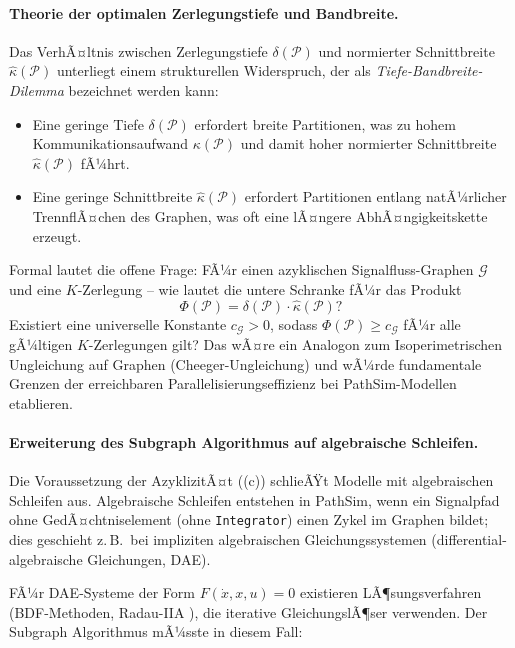 ﻿\documentclass[12pt,a4paper]{article}
\theoremstyle{definition}
\begin{document}
\paragraph{Theorie der optimalen Zerlegungstiefe und Bandbreite.}
Das VerhÃ¤ltnis zwischen Zerlegungstiefe $\delta(\mathcal{P})$ und
normierter Schnittbreite $\hat{\kappa}(\mathcal{P})$ unterliegt einem
strukturellen Widerspruch, der als \emph{Tiefe-Bandbreite-Dilemma}
bezeichnet werden kann:

\begin{itemize}[nosep]
  \item Eine geringe Tiefe $\delta(\mathcal{P})$ erfordert breite Partitionen,
        was zu hohem Kommunikationsaufwand $\kappa(\mathcal{P})$
        und damit hoher normierter Schnittbreite $\hat{\kappa}(\mathcal{P})$ fÃ¼hrt.
  \item Eine geringe Schnittbreite $\hat{\kappa}(\mathcal{P})$ erfordert
        Partitionen entlang natÃ¼rlicher TrennflÃ¤chen des Graphen,
        was oft eine lÃ¤ngere AbhÃ¤ngigkeitskette erzeugt.
\end{itemize}

Formal lautet die offene Frage: FÃ¼r einen azyklischen Signalfluss-Graphen
$\mathcal{G}$ und eine $K$-Zerlegung -- wie lautet die untere Schranke
fÃ¼r das Produkt
\[
  \Phi(\mathcal{P}) = \delta(\mathcal{P}) \cdot \hat{\kappa}(\mathcal{P})?
\]
Existiert eine universelle Konstante $c_{\mathcal{G}} > 0$, sodass
$\Phi(\mathcal{P}) \geq c_{\mathcal{G}}$ fÃ¼r alle gÃ¼ltigen $K$-Zerlegungen
gilt? Das wÃ¤re ein Analogon zum Isoperimetrischen Ungleichung auf
Graphen (Cheeger-Ungleichung) und wÃ¼rde fundamentale Grenzen der
erreichbaren Parallelisierungseffizienz bei PathSim-Modellen etablieren.

\paragraph{Erweiterung des Subgraph Algorithmus auf algebraische Schleifen.}
Die Voraussetzung der AzyklizitÃ¤t ((c)) schlieÃŸt
Modelle mit algebraischen Schleifen aus. Algebraische Schleifen
entstehen in PathSim, wenn ein Signalpfad ohne GedÃ¤chtniselement
(ohne \texttt{Integrator}) einen Zykel im Graphen bildet; dies
geschieht z.\,B.\ bei impliziten algebraischen Gleichungssystemen
(differential-algebraische Gleichungen, DAE).

FÃ¼r DAE-Systeme der Form $F(\dot{x}, x, u) = 0$ existieren
LÃ¶sungsverfahren (BDF-Methoden, Radau-IIA \cite{gear1971}), die
iterative GleichungslÃ¶ser verwenden. Der Subgraph Algorithmus
mÃ¼sste in diesem Fall:
\end{document}
